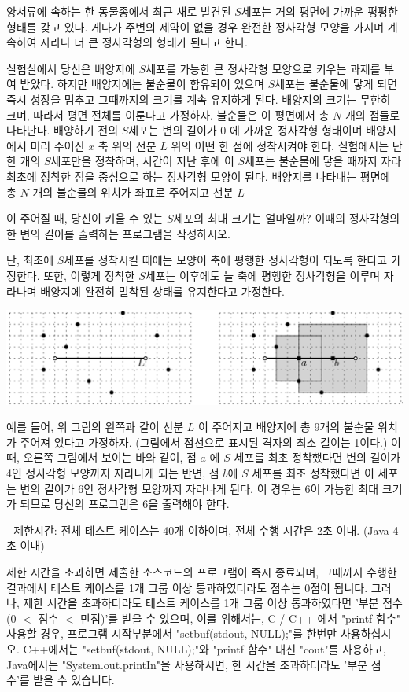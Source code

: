\documentclass [12pt] {oblivoir}
\begin{document}
양서류에 속하는 한 동물종에서 최근 새로 발견된 $S$세포는 거의 평면에 가까운 평평한 형태를 갖고 있다.
게다가 주변의 제약이 없을 경우 완전한 정사각형 모양을 가지며 계속하여 자라나 더 큰 정사각형의 형태가 된다고 한다.

실험실에서 당신은 배양지에 $S$세포를 가능한 큰 정사각형 모양으로 키우는 과제를 부여 받았다.
하지만 배양지에는 불순물이 함유되어 있으며 $S$세포는 불순물에 닿게 되면 즉시 성장을 멈추고 그때까지의 크기를 계속 유지하게 된다.
배양지의 크기는 무한히 크며, 따라서 평면 전체를 이룬다고 가정하자.
불순물은 이 평면에서 총 $N$ 개의 점들로 나타난다.
배양하기 전의 $S$세포는 변의 길이가 0 에 가까운 정사각형 형태이며 배양지에서 미리 주어진 $x$ 축 위의 선분 $L$ 위의 어떤 한 점에 정착시켜야 한다.
실험에서는 단 한 개의 $S$세포만을 정착하며, 시간이 지난 후에 이 $S$세포는 불순물에 닿을 때까지 자라 최초에 정착한 점을 중심으로 하는 정사각형 모양이 된다.
배양지를 나타내는 평면에 총 $N$ 개의 불순물의 위치가 좌표로 주어지고 선분 $L$

이 주어질 때, 당신이 키울 수 있는 $S$세포의 최대 크기는 얼마일까?
이때의 정사각형의 한 변의 길이를 출력하는 프로그램을 작성하시오.

단, 최초에 $S$세포를 정착시킬 때에는 모양이 축에 평행한 정사각형이 되도록 한다고 가정한다.
또한, 이렇게 정착한 $S$세포는 이후에도 늘 축에 평행한 정사각형을 이루며 자라나며 배양지에 완전히 밀착된 상태를 유지한다고 가정한다.

\includegraphics[scale=0.5]{n5.png}

예를 들어,  위 그림의 왼쪽과 같이 선분 $L$ 이 주어지고 배양지에 총 9개의 불순물 위치가 주어져 있다고 가정하자. (그림에서 점선으로 표시된 격자의 최소 길이는 1이다.)
이 때, 오른쪽 그림에서 보이는 바와 같이, 점 $a$ 에 $S$ 세포를 최초 정착했다면 변의 길이가 4인 정사각형 모양까지 자라나게 되는 반면, 점 $b$에 $S$ 세포를 최초 정착했다면 이 세포는 변의 길이가 6인 정사각형 모양까지 자라나게 된다.
이 경우는 6이 가능한 최대 크기가 되므로 당신의 프로그램은 6을 출력해야 한다.


- 제한시간: 전체 테스트 케이스는 40개 이하이며, 전체 수행 시간은 2초 이내. (Java 4초 이내)

제한 시간을 초과하면 제출한 소스코드의 프로그램이 즉시 종료되며,
그때까지 수행한 결과에서 테스트 케이스를 1개 그룹 이상 통과하였더라도 점수는 0점이 됩니다.
그러나, 제한 시간을 초과하더라도 테스트 케이스를 1개 그룹 이상 통과하였다면 '부분 점수(0 $<$ 점수 $<$ 만점)'를 받을 수 있으며,
이를 위해서는, C / C++ 에서 "printf 함수" 사용할 경우, 프로그램 시작부분에서 "setbuf(stdout, NULL);"를 한번만 사용하십시오.
C++에서는 "setbuf(stdout, NULL);"와 "printf 함수" 대신 "cout"를 사용하고, Java에서는 "System.out.printIn"을 사용하시면,
한 시간을 초과하더라도 '부분 점수'를 받을 수 있습니다.
\end{document}

